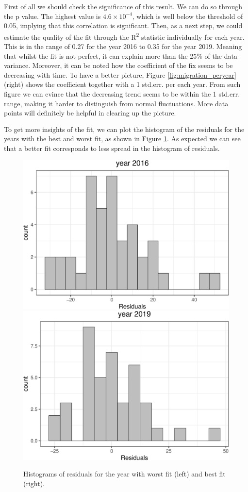 \documentclass[
]{article}
\begin{document}
First of all we should check the significance of this result. We can do
so through the p value. The highest value is
\ensuremath{4.6\times 10^{-4}}, which is well below the threshold of
0.05, implying that this correlation is significant. Then, as a next
step, we could estimate the quality of the fit through the
R\textsuperscript{2} statistic individually for each year. This is in
the range of 0.27 for the year 2016 to 0.35 for the year 2019. Meaning
that whilst the fit is not perfect, it can explain more than the 25\% of
the data variance. Moreover, it can be noted how the coefficient of the
fix seems to be decreasing with time. To have a better picture, Figure
\ref{fig:migration_peryear} (right) shows the coefficient together with
a 1 std.err. per each year. From such figure we can evince that the
decreasing trend seems to be within the 1 std.err. range, making it
harder to distinguish from normal fluctuations. More data points will
definitely be helpful in clearing up the picture.

To get more insights of the fit, we can plot the histogram of the
residuals for the years with the best and worst fit, as shown in Figure
\ref{fig:residuals_hist}. As expected we can see that a better fit
corresponds to less spread in the histogram of residuals.

\begin{figure}
\includegraphics[width=0.5\linewidth]{main_files/figure-latex/residuals_hist-1} \includegraphics[width=0.5\linewidth]{main_files/figure-latex/residuals_hist-2} \caption{Histograms of residuals for the year with worst fit (left) and best fit (right). \label{fig:residuals_hist}}\label{fig:residuals_hist}
\end{figure}
\end{document}
